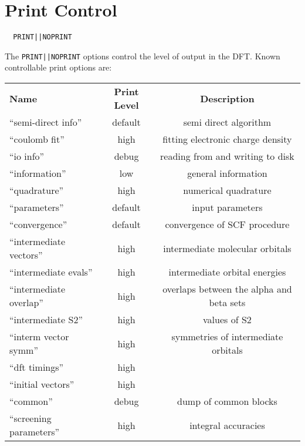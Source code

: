 \section{Print Control}
\begin{verbatim}
  PRINT||NOPRINT
\end{verbatim}

The \verb+PRINT||NOPRINT+ options control the level of output in the
DFT.  Known controllable print options are:

\begin{table}[htbp]
\begin{center}
\begin{tabular}{lcc}
  {\bf Name}          & {\bf Print Level} & {\bf Description} \\
 ``semi-direct info''               & default     & semi direct algorithm \\
 ``coulomb fit''                    & high        & fitting electronic charge density \\
 ``io info''                        & debug       & reading from and writing to disk  \\
 ``information''                    & low         & general information  \\
 ``quadrature''                     & high        & numerical quadrature  \\
 ``parameters''                     & default     & input parameters \\
 ``convergence''                    & default     & convergence of SCF procedure \\
 ``intermediate vectors''           & high        & intermediate molecular orbitals \\
 ``intermediate evals''             & high        & intermediate orbital energies \\
 ``intermediate overlap''           & high        & overlaps between the alpha and beta sets \\
 ``intermediate S2''                & high        & values of S2 \\
 ``interm vector symm''             & high        & symmetries of intermediate orbitals \\
 ``dft timings''                    & high        & \\
 ``initial vectors''                & high        & \\
 ``common''                         & debug       & dump of common blocks \\
 ``screening parameters''           & high        & integral accuracies \\

\end{tabular}
\end{center}
\end{table}

